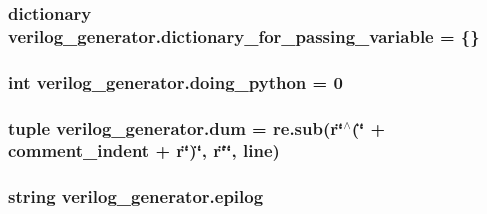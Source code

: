 \hypertarget{namespaceverilog__generator_a3013d1cc593da9b9bf0d2070d1efa32b}{
\subsubsection[{dictionary\-\_\-for\-\_\-passing\-\_\-variable}]{\setlength{\rightskip}{0pt plus 5cm}dictionary verilog\-\_\-generator.\-dictionary\-\_\-for\-\_\-passing\-\_\-variable = \{\}}}\label{namespaceverilog__generator_a3013d1cc593da9b9bf0d2070d1efa32b}
\hypertarget{namespaceverilog__generator_a0d06d215d8d94fd14381a66bf96fc683}{
\subsubsection[{doing\-\_\-python}]{\setlength{\rightskip}{0pt plus 5cm}int verilog\-\_\-generator.\-doing\-\_\-python = 0}}\label{namespaceverilog__generator_a0d06d215d8d94fd14381a66bf96fc683}
\hypertarget{namespaceverilog__generator_a8d95b4550b774331a0bbcd9fa6fdd934}{
\subsubsection[{dum}]{\setlength{\rightskip}{0pt plus 5cm}tuple verilog\-\_\-generator.\-dum = re.\-sub(r\char`\"{}$^\wedge$(\char`\"{} + {\bf comment\-\_\-indent} + r\char`\"{})\char`\"{}, r\char`\"{}\char`\"{}, line)}}\label{namespaceverilog__generator_a8d95b4550b774331a0bbcd9fa6fdd934}
\hypertarget{namespaceverilog__generator_a4524ff0556a251f5fb377c73c43c62fd}{
\subsubsection[{epilog}]{\setlength{\rightskip}{0pt plus 5cm}string verilog\-\_\-generator.\-epilog}}\label{namespaceverilog__generator_a4524ff0556a251f5fb377c73c43c62fd}

